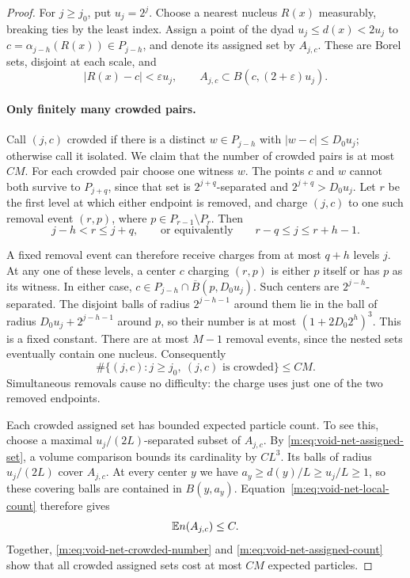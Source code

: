 \begin{proof}
For $j\ge j_0$, put $u_j=2^j$. Choose a nearest nucleus $R(x)$
measurably, breaking ties by the least index. Assign a point of the dyad
$u_j\le d(x)<2u_j$ to
$c=\alpha_{j-h}(R(x))\in P_{j-h}$, and denote its assigned set by
$A_{j,c}$. These are Borel sets, disjoint at each scale, and
\begin{equation}\label{m:eq:void-net-assigned-set}
 |R(x)-c|<\varepsilon u_j,\qquad
 A_{j,c}\subset B(c,(2+\varepsilon)u_j).
\end{equation}

\paragraph{Only finitely many crowded pairs.}
Call $(j,c)$ crowded if there is a distinct
$w\in P_{j-h}$ with $|w-c|\le D_0u_j$; otherwise call it isolated.
We claim that the number of crowded pairs is at most $CM$.
For each crowded pair choose one witness $w$. The points $c$ and $w$
cannot both survive to $P_{j+q}$, since that set is
$2^{j+q}$-separated and $2^{j+q}>D_0u_j$. Let $r$ be the first level
at which either endpoint is removed, and charge $(j,c)$ to one such
removal event $(r,p)$, where $p\in P_{r-1}\setminus P_r$. Then
\begin{equation}\label{m:eq:void-net-charge-window}
 j-h<r\le j+q,
 \qquad\text{or equivalently}\qquad
 r-q\le j\le r+h-1.
\end{equation}

A fixed removal event can therefore receive charges from at most $q+h$
levels $j$. At any one of these levels, a center $c$ charging $(r,p)$
is either $p$ itself or has $p$ as its witness. In either case,
$c\in P_{j-h}\cap\overline B(p,D_0u_j)$. Such centers are
$2^{j-h}$-separated. The disjoint balls of radius $2^{j-h-1}$ around
them lie in the ball of radius $D_0u_j+2^{j-h-1}$ around $p$, so their
number is at most $(1+2D_0 2^h)^3$. This is a fixed constant. There are
at most $M-1$ removal events, since the nested sets eventually contain
one nucleus. Consequently
\begin{equation}\label{m:eq:void-net-crowded-number}
 \#\{(j,c):j\ge j_0,\ (j,c)\text{ is crowded}\}\le CM.
\end{equation}
Simultaneous removals cause no difficulty: the charge uses just one of
the two removed endpoints.

Each crowded assigned set has bounded expected particle count. To see
this, choose a maximal $u_j/(2L)$-separated subset of $A_{j,c}$.
By \eqref{m:eq:void-net-assigned-set}, a volume comparison bounds its cardinality
by $CL^3$. Its balls of radius $u_j/(2L)$ cover $A_{j,c}$.
At every center $y$ we have
$a_y\ge d(y)/L\ge u_j/L\ge1$, so these covering balls are contained
in $B(y,a_y)$. Equation~\eqref{m:eq:void-net-local-count} therefore gives
\begin{equation}\label{m:eq:void-net-assigned-count}
 \mathbb E n(A_{j,c})\le C.
\end{equation}
Together, \eqref{m:eq:void-net-crowded-number} and
\eqref{m:eq:void-net-assigned-count} show that all crowded assigned sets cost at
most $CM$ expected particles.


\end{proof}
